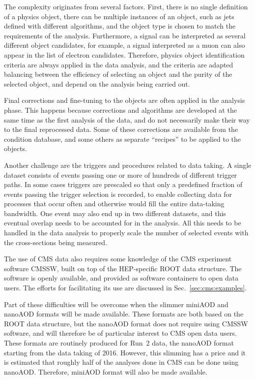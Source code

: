 \documentclass[10pt]{article}
\begin{document}
The complexity originates from several factors. First, there is no single definition of a physics object, there can be multiple instances of an object, such as jets defined with different algorithms, and the object type is chosen to match the requirements of the analysis. Furthermore, a signal can be interpreted as several different object candidates, for example, a signal interpreted as a muon can also appear in the list of electron candidates. Therefore, physics object identification criteria are always applied in the data analysis, and the criteria are adapted balancing between the efficiency of selecting an object and the purity of the selected object, and depend on the analysis being carried out.

Final corrections and fine-tuning to the objects are often applied in the analysis phase. This happens because corrections and algorithms are developed at the same time as the first analysis of the data, and do not necessarily make their way to the final reprocessed data. Some of these corrections are available from the condition database, and some others as separate ``recipes'' to be applied to the objects.

Another challenge are the triggers and procedures related to data taking. A single dataset consists of events passing one or more of hundreds of different trigger paths. In some cases triggers are prescaled so that only a predefined fraction of events passing the trigger selection is recorded, to enable collecting data for processes that occur often and otherwise would fill the entire data-taking bandwidth. One event may also end up in two different datasets, and this eventual overlap needs to be accounted for in the analysis. All this needs to be handled in the data analysis to properly scale the number of selected events with the cross-sections being measured.

The use of CMS data also requires some knowledge of the CMS experiment software CMSSW, built on top of the HEP-specific ROOT data structure. The software is openly available, and provided as software containers to open data users. The efforts for facilitating its use are discussed in Sec.~\ref{sec:cms:examples}.

Part of these difficulties will be overcome when the slimmer miniAOD and nanoAOD formats will be made available. These formats are both based on the ROOT data structure, but the nanoAOD format does not require using CMSSW software, and will therefore be of particular interest to CMS open data users. These formats are routinely produced for Run~2 data, the nanoAOD format starting from the data taking of 2016. However, this slimming has a price and it is estimated that roughly half of the analyses done in CMS can be done using nanoAOD. Therefore, miniAOD format will also be made available. 
\end{document}
